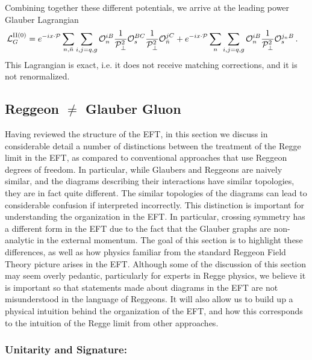 \documentclass[letterpaper,11pt]{article}
\newcommand{\cL}{\mathcal{L}}
\newcommand{\cO}{\mathcal{O}}
\newcommand{\cP}{{\cal P}}
\begin{document}
Combining together these different potentials, we arrive at the leading power Glauber Lagrangian \cite{Rothstein:2016bsq}
\begin{align}\label{eq:Glauber_Lagrangian}
\cL_G^{\text{II}(0)} 
&= e^{-ix\cdot \cP} \sum\limits_{n,\bar n} \sum\limits_{i,j=q,g}   \cO_n^{iB} \frac{1}{\cP_\perp^2} \cO_s^{BC}   \frac{1}{\cP_\perp^2} \cO_{\bar n}^{jC}   + e^{-ix\cdot \cP} \sum\limits_{n} \sum\limits_{i,j=q,g} \cO_n^{iB}   \frac{1}{\cP_\perp^2} \cO_s^{j_n B}\,.
\end{align}
This Lagrangian is exact, i.e. it does not receive matching corrections, and it is not renormalized. 

\subsection{Reggeon $\neq$ Glauber Gluon}
\label{sec:neqglaub}

Having reviewed the structure of the EFT, in this section we discuss in considerable detail a number of distinctions between the treatment of the Regge limit in the EFT, as compared to conventional approaches that use Reggeon degrees of freedom. In particular, while Glaubers and Reggeons are naively similar, and the diagrams describing their interactions have similar topologies, they are in fact quite different. The similar topologies of the diagrams can lead to considerable confusion if interpreted incorrectly. This distinction is important for understanding the organization in the EFT. In particular, crossing symmetry has a different form in the EFT due to the fact that the Glauber graphs are non-analytic in the external momentum. The goal of this section is to highlight these differences, as well as how physics familiar from the standard Reggeon Field Theory picture arises in the EFT. Although some of the discussion of this section may seem overly pedantic, particularly for experts in Regge physics, we believe it is important so that statements made about diagrams in the EFT are not misunderstood in the language of Reggeons. It will also allow us to build up a physical intuition behind the organization of the EFT, and how this corresponds to the intuition of the Regge limit from other approaches.

\subsubsection*{Unitarity and Signature:}
\end{document}
